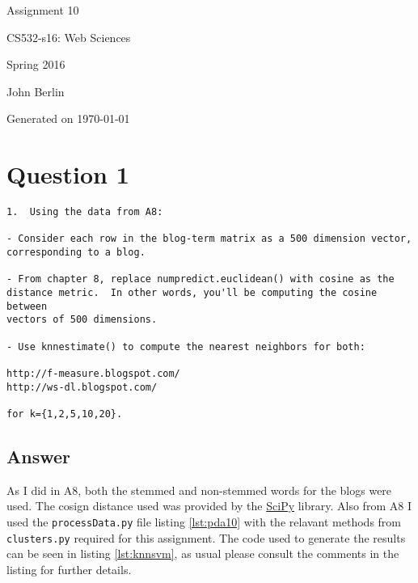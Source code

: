 \documentclass[letterpaper,10pt]{article}
\begin{document}
 

\begin{titlepage}

\begin{center}

\Huge{Assignment 10}

\Large{CS532-s16:  Web Sciences}

\Large{Spring 2016}

\Large{John Berlin}

\Large Generated on \today

\end{center}

\end{titlepage}
\newpage
\printindex
\listoftables
\lstlistoflistings
\newpage
\section*{Question 1}

\begin{verbatim}
1.  Using the data from A8:

- Consider each row in the blog-term matrix as a 500 dimension vector, 
corresponding to a blog.  

- From chapter 8, replace numpredict.euclidean() with cosine as the 
distance metric.  In other words, you'll be computing the cosine between
vectors of 500 dimensions.  

- Use knnestimate() to compute the nearest neighbors for both:

http://f-measure.blogspot.com/
http://ws-dl.blogspot.com/

for k={1,2,5,10,20}.
\end{verbatim}
\subsection*{Answer}

As I did in A8, both the stemmed and non-stemmed words for the blogs were used. The cosign distance used was provided by the \href{http://docs.scipy.org/doc/scipy-0.14.0/reference/generated/scipy.spatial.distance.cosine.html}{SciPy} library. Also from A8 I used the \verb+processData.py+  file listing \hyperref[lst:pda10]{\ref{lst:pda10}} with the relavant methods from \verb+clusters.py+  required for this assignment. The code used to generate the results can be seen in listing \hyperref[lst:knnsvm]{\ref{lst:knnsvm}}, as usual please consult the comments in the listing for further details.
\end{document}
